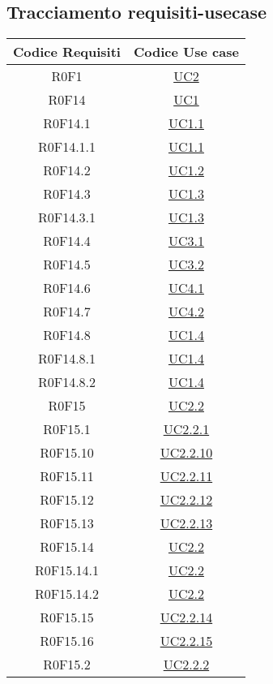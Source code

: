 \documentclass[../AnalisiDeiRequisiti.tex]{subfiles}
\begin{document}
\subsection{Tracciamento requisiti-usecase}
\normalsize
\begin{longtable}{|c|c|}
	\hline
	\textbf{Codice Requisiti} & \textbf{Codice Use case} \\
	\hline
	\endhead
	R0F1 & \hyperlink{UC2}{UC2}\\\hline
	R0F14 & \hyperlink{UC1}{UC1}\\\hline
	R0F14.1 & \hyperlink{UC1.1}{UC1.1}\\\hline
	R0F14.1.1 & \hyperlink{UC1.1}{UC1.1}\\\hline
	R0F14.2 & \hyperlink{UC1.2}{UC1.2}\\\hline
	R0F14.3 & \hyperlink{UC1.3}{UC1.3}\\\hline
	R0F14.3.1 & \hyperlink{UC1.3}{UC1.3}\\\hline
	R0F14.4 & \hyperlink{UC3.1}{UC3.1}\\\hline
	R0F14.5 & \hyperlink{UC3.2}{UC3.2}\\\hline
	R0F14.6 & \hyperlink{UC4.1}{UC4.1}\\\hline
	R0F14.7 & \hyperlink{UC4.2}{UC4.2}\\\hline
	R0F14.8 & \hyperlink{UC1.4}{UC1.4}\\\hline
	R0F14.8.1 & \hyperlink{UC1.4}{UC1.4}\\\hline
	R0F14.8.2 & \hyperlink{UC1.4}{UC1.4}\\\hline
	R0F15 & \hyperlink{UC2.2}{UC2.2}\\\hline
	R0F15.1 & \hyperlink{UC2.2.1}{UC2.2.1}\\\hline
	R0F15.10 & \hyperlink{UC2.2.10}{UC2.2.10}\\\hline
	R0F15.11 & \hyperlink{UC2.2.11}{UC2.2.11}\\\hline
	R0F15.12 & \hyperlink{UC2.2.12}{UC2.2.12}\\\hline
	R0F15.13 & \hyperlink{UC2.2.13}{UC2.2.13}\\\hline
	R0F15.14 & \hyperlink{UC2.2}{UC2.2}\\\hline
	R0F15.14.1 & \hyperlink{UC2.2}{UC2.2}\\\hline
	R0F15.14.2 & \hyperlink{UC2.2}{UC2.2}\\\hline
	R0F15.15 & \hyperlink{UC2.2.14}{UC2.2.14}\\\hline
	R0F15.16 & \hyperlink{UC2.2.15}{UC2.2.15}\\\hline
	R0F15.2 & \hyperlink{UC2.2.2}{UC2.2.2}\\\hline

\end{longtable}
\end{document}
